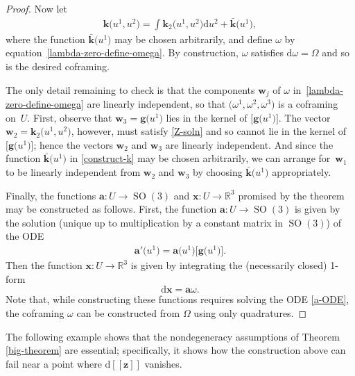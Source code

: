 \documentclass[pdftex]{sigma}
\numberwithin{equation}{section}
\renewcommand{\d}{\mathrm{d}}%
\newcommand{\bbR}{{\mathbb R}}
\newcommand{\SO}{\operatorname{SO}}
\newcommand{\mba}{\mathbf{a}}
\newcommand{\mbg}{\mathbf{g}}
\newcommand{\mbk}{\mathbf{k}}
\newcommand{\mbw}{\mathbf{w}}
\newcommand{\mbx}{\mathbf{x}}
\newcommand{\mbz}{\mathbf{z}}
\begin{document}
\begin{proof}
Now let
\begin{gather}\label{construct-k}
 \mbk\big(u^1, u^2\big) = \int \mbk_2\big(u^1, u^2\big) \d u^2 + \bar{\mbk}\big(u^1\big),
\end{gather}
where the function $\bar{\mbk}\big(u^1\big)$ may be chosen arbitrarily,
and define $\omega$ by equation~\eqref{lambda-zero-define-omega}. By construction, $\omega$ satisfies $\d\omega = \Omega$ and so is the desired coframing.

The only detail remaining to check is that the components $\mbw_j$ of $\omega$ in~\eqref{lambda-zero-define-omega} are linearly independent, so that $\big(\omega^1, \omega^2, \omega^3\big)$ is a coframing on~$U$. First, observe that $\mbw_3 = \mbg\big(u^1\big)$ lies in the kernel of $\big[\mbg\big(u^1\big)\big]$. The vector $\mbw_2 = \mbk_2\big(u^1, u^2\big)$, however, must satisfy \eqref{Z-soln} and so cannot lie in the kernel of $\big[\mbg\big(u^1\big)\big]$; hence the vectors $\mbw_2$ and $\mbw_3$ are linearly independent. And since the function $\bar{\mbk}\big(u^1\big)$ in \eqref{construct-k} may be chosen arbitrarily, we can arrange for~$\mbw_1$ to be linearly independent from $\mbw_2$ and $\mbw_3$ by choosing $\bar{\mbk}\big(u^1\big)$ appropriately.

Finally, the functions $\mba\colon U \to \SO(3)$ and $\mbx\colon U \to \bbR^3$ promised by the theorem may be constructed as follows. First, the function $\mba\colon U \to \SO(3)$ is given by the solution (unique up to multiplication by a constant matrix in $\SO(3)$) of the ODE
\begin{gather}\label{a-ODE}
\mba'\big(u^1\big) = \mba\big(u^1\big) \big[\mbg\big(u^1\big)\big].
\end{gather}
Then the function $\mbx\colon U \to \bbR^3$ is given by integrating the (necessarily closed) 1-form
\[ \d\mbx = \mba \omega. \]
Note that, while constructing these functions requires solving the ODE \eqref{a-ODE}, the coframing $\omega$ can be constructed from $\Omega$ using only quadratures.
\end{proof}

The following example shows that the nondegeneracy assumptions of Theorem \ref{big-theorem} are essential; specifically, it shows how the construction above can fail near a point where $\d[\![\mbz]\!]$ vanishes.
\end{document}
